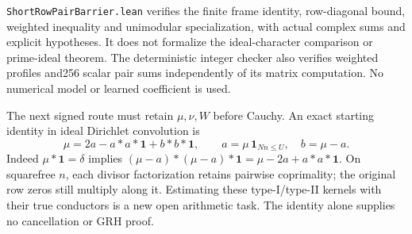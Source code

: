 \texttt{ShortRowPairBarrier.lean} verifies the finite frame identity,
row-diagonal bound, weighted inequality and unimodular specialization,
with actual complex sums and explicit hypotheses. It does not formalize
the ideal-character comparison or prime-ideal theorem. The deterministic
integer checker also verifies weighted profiles and256 scalar pair sums
independently of its matrix computation. No numerical model or learned
coefficient is used.

The next signed route must retain $\mu,\nu,W$ before Cauchy. An exact
starting identity in ideal Dirichlet convolution is
\[
 \mu=2a-a*a*\mathbf1+b*b*\mathbf1,\qquad
 a=\mu\,\mathbf1_{Nn\le U},\quad b=\mu-a.
\]
Indeed $\mu*\mathbf1=\delta$ implies
$(\mu-a)*(\mu-a)*\mathbf1=\mu-2a+a*a*\mathbf1$.
On squarefree $n$, each divisor factorization retains pairwise
coprimality; the original row zeros still multiply along it. Estimating
these type-I/type-II kernels with their true conductors is a new open
arithmetic task. The identity alone supplies no cancellation or GRH proof.
